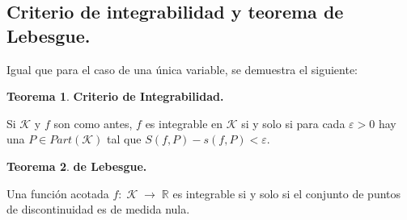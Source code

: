 \documentclass[12pt,twoside]{report}
\newcommand\mc[1]{\mathcal{#1}}
\theoremstyle{azul}
\theoremstyle{azul2}
\theoremstyle{plain}
\theoremstyle{definition}
\newtheorem{teo}{Teorema}[chapter]
\theoremstyle{remark}
\begin{document}
\subsection{ Criterio de integrabilidad y teorema de Lebesgue.}

Igual que para el caso de una única variable, se demuestra el siguiente:
\begin{teo} \textbf{Criterio de Integrabilidad.} 

Si $\mc{K}$ y $f$ son como antes, $f$ es integrable en $\mc{K}$ si y solo si para cada $\varepsilon > 0$ hay una $P \in Part(\mc{K})$ tal que $S(f,P)-s(f,P) < \varepsilon$.
\end{teo}
\newpage
\begin{teo} \textbf{de Lebesgue.}

Una función acotada $f:\; \mc{K} \;\longrightarrow \; \mathbb{R}$ es integrable si y solo si el conjunto de puntos de discontinuidad es de medida nula.
\end{teo}
\end{document}
